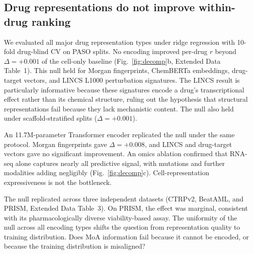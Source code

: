 \subsection*{Drug representations do not improve within-drug ranking}

We evaluated all major drug representation types under ridge regression with 10-fold drug-blind CV on PASO splits. No encoding improved per-drug $r$ beyond $\Delta = +0.001$ of the cell-only baseline (Fig.~\ref{fig:decomp}b, Extended Data Table~1). This null held for Morgan fingerprints, ChemBERTa embeddings, drug-target vectors, and LINCS L1000 perturbation signatures\cite{subramanian2017next}. The LINCS result is particularly informative because these signatures encode a drug's transcriptional effect rather than its chemical structure, ruling out the hypothesis that structural representations fail because they lack mechanistic content. The null also held under scaffold-stratified splits ($\Delta = +0.001$).

An 11.7M-parameter Transformer encoder replicated the null under the same protocol. Morgan fingerprints gave $\Delta = +0.008$, and LINCS and drug-target vectors gave no significant improvement. An omics ablation confirmed that RNA-seq alone captures nearly all predictive signal, with mutations and further modalities adding negligibly (Fig.~\ref{fig:decomp}c). Cell-representation expressiveness is not the bottleneck.

The null replicated across three independent datasets (CTRPv2, BeatAML, and PRISM, Extended Data Table~3). On PRISM, the effect was marginal, consistent with its pharmacologically diverse viability-based assay. The uniformity of the null across all encoding types shifts the question from representation quality to training distribution. Does MoA information fail because it cannot be encoded, or because the training distribution is misaligned?
